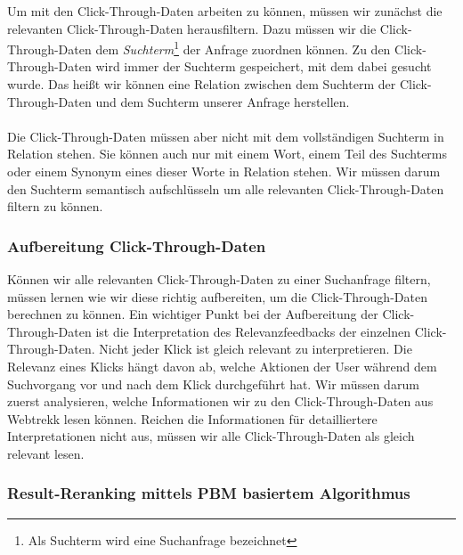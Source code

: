 Um mit den Click-Through-Daten arbeiten zu können, müssen wir zunächst die relevanten Click-Through-Daten herausfiltern. Dazu müssen wir die Click-Through-Daten dem \textit{Suchterm}\footnote{Als Suchterm wird eine Suchanfrage bezeichnet} der Anfrage zuordnen können. Zu den Click-Through-Daten wird immer der Suchterm gespeichert, mit dem dabei gesucht wurde. Das heißt wir können eine Relation zwischen dem Suchterm der Click-Through-Daten und dem Suchterm unserer Anfrage herstellen.
\\
\\
Die Click-Through-Daten müssen aber nicht mit dem vollständigen Suchterm in Relation stehen. Sie können auch nur mit einem Wort, einem Teil des Suchterms oder einem Synonym eines dieser Worte in Relation stehen. Wir müssen darum den Suchterm semantisch aufschlüsseln um alle relevanten Click-Through-Daten filtern zu können. 

\subsubsection{Aufbereitung Click-Through-Daten}
\label{sec:Einfuehrung:Methodik:Click-Through-Daten}

Können wir alle relevanten Click-Through-Daten zu einer Suchanfrage filtern, müssen lernen wie wir diese richtig aufbereiten, um die Click-Through-Daten berechnen zu können.  Ein wichtiger Punkt bei der Aufbereitung der Click-Through-Daten ist die Interpretation des Relevanzfeedbacks der einzelnen Click-Through-Daten. Nicht jeder Klick ist gleich relevant zu interpretieren. Die Relevanz eines Klicks hängt davon ab, welche Aktionen der User während dem Suchvorgang vor und nach dem Klick durchgeführt hat. Wir müssen darum zuerst analysieren, welche Informationen wir zu den Click-Through-Daten aus Webtrekk lesen können.  Reichen die Informationen für detailliertere Interpretationen nicht aus, müssen wir alle Click-Through-Daten als gleich relevant lesen.

\subsubsection{Result-Reranking mittels PBM basiertem Algorithmus}
\label{sec:Einfuehrung:Methodik:Result-RerankingPBM}

